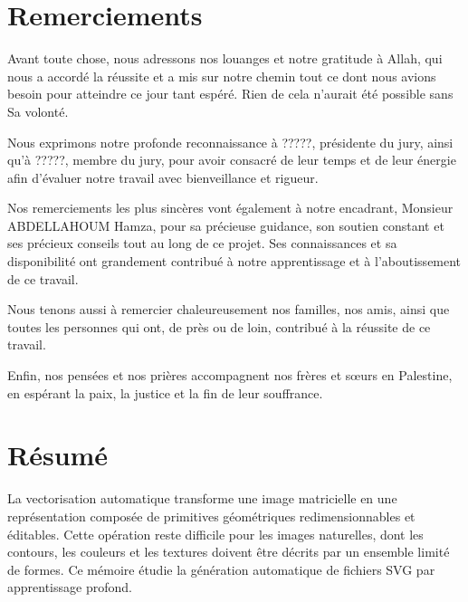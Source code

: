 \documentclass[12pt, a4paper, oneside]{report}
\begin{document}
\setcounter{page}{1}

\chapter*{Remerciements}

\begingroup
\setlength{\parskip}{0.8\baselineskip}

Avant toute chose, nous adressons nos louanges et notre gratitude à Allah, qui nous a accordé la réussite et a mis sur notre chemin tout ce dont nous avions besoin pour atteindre ce jour tant espéré. Rien de cela n’aurait été possible sans Sa volonté.

Nous exprimons notre profonde reconnaissance à ?????, présidente du jury, ainsi qu’à ?????, membre du jury, pour avoir consacré de leur temps et de leur énergie afin d’évaluer notre travail avec bienveillance et rigueur.

Nos remerciements les plus sincères vont également à notre encadrant, Monsieur ABDELLAHOUM Hamza, pour sa précieuse guidance, son soutien constant et ses précieux conseils tout au long de ce projet. Ses connaissances et sa disponibilité ont grandement contribué à notre apprentissage et à l’aboutissement de ce travail.

Nous tenons aussi à remercier chaleureusement nos familles, nos amis, ainsi que toutes les personnes qui ont, de près ou de loin, contribué à la réussite de ce travail.

Enfin, nos pensées et nos prières accompagnent nos frères et sœurs en Palestine, en espérant la paix, la justice et la fin de leur souffrance.

\par
\endgroup

\newpage

\chapter*{Résumé}

La vectorisation automatique transforme une image matricielle en une représentation composée
de primitives géométriques redimensionnables et éditables. Cette opération reste difficile pour
les images naturelles, dont les contours, les couleurs et les textures doivent être décrits par un
ensemble limité de formes. Ce mémoire étudie la génération automatique de fichiers SVG par
apprentissage profond.
\end{document}
